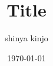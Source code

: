 \documentclass[a4paper,11pt]{jsarticle}
\begin{document}
\title{Title}
\author{shinya kinjo}
\date{\today}
\maketitle
\end{document}

